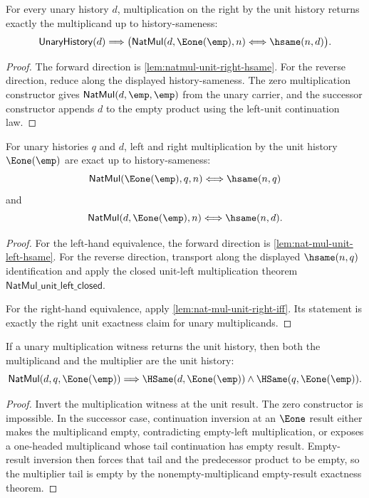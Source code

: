\begin{lemma}
\label{lem:nat-mul-unit-right-iff}
For every unary history $d$, multiplication on the right by the unit history
returns exactly the multiplicand up to history-sameness:
$$
\mathsf{UnaryHistory}(d)
\Longrightarrow
\bigl(\mathsf{NatMul}(d,\Eone(\emp),n)\Longleftrightarrow \hsame(n,d)\bigr).
$$
\end{lemma}
\begin{proof}
The forward direction is
\autoref{lem:natmul-unit-right-hsame}. For the reverse direction, reduce along
the displayed history-sameness. The zero multiplication constructor gives
$\mathsf{NatMul}(d,\emp,\emp)$ from the unary carrier, and the successor
constructor appends $d$ to the empty product using the left-unit continuation
law.
\end{proof}

\begin{theorem}
\label{thm:natmul-two-sided-unit-exactness}
For unary histories $q$ and $d$, left and right multiplication by the unit
history $\Eone(\emp)$ are exact up to history-sameness:
$$
\mathsf{NatMul}(\Eone(\emp),q,n)\Longleftrightarrow \hsame(n,q)
$$
and
$$
\mathsf{NatMul}(d,\Eone(\emp),n)\Longleftrightarrow \hsame(n,d).
$$
\end{theorem}
\begin{proof}
For the left-hand equivalence, the forward direction is
\autoref{lem:nat-mul-unit-left-hsame}. For the reverse direction, transport
along the displayed $\hsame(n,q)$ identification and apply the closed unit-left
multiplication theorem $\mathsf{NatMul\_unit\_left\_closed}$.

For the right-hand equivalence, apply
\autoref{lem:nat-mul-unit-right-iff}. Its statement is exactly the right unit
exactness claim for unary multiplicands.
\end{proof}

\begin{theorem}
\label{thm:natmul-unit-result-factors-unit}
If a unary multiplication witness returns the unit history, then both the
multiplicand and the multiplier are the unit history:
$$
\mathsf{NatMul}(d,q,\Eone(\emp))
\Longrightarrow
\HSame(d,\Eone(\emp))\wedge \HSame(q,\Eone(\emp)).
$$
\end{theorem}
\begin{proof}
Invert the multiplication witness at the unit result. The zero constructor is
impossible. In the successor case, continuation inversion at an \(\Eone\)
result either makes the multiplicand empty, contradicting empty-left
multiplication, or exposes a one-headed multiplicand whose tail continuation
has empty result. Empty-result inversion then forces that tail and the
predecessor product to be empty, so the multiplier tail is empty by the
nonempty-multiplicand empty-result exactness theorem.
\end{proof}

